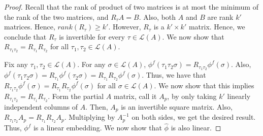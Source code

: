 \documentclass[10pt,letterpaper]{article}
\newcommand{\calL}{{\mathcal{L}}}
\newcommand{\rank}{{\calL(A)}}
\begin{document}
\begin{proof}
Recall that the rank of product of two matrices is at most the minimum of the rank of the two matrices, and $R_{\tau} A = B$. Also, both $A$ and $B$ are rank $k'$ matrices. Hence, $rank(R_{\tau}) \ge k'$. However, $R_{\tau}$ is a $k' \times k'$ matrix. Hence, we conclude that $R_{\tau}$ is invertible for every $\tau \in \rank$. We now show that $R_{\tau_1 \tau_2} = R_{\tau_1} R_{\tau_2}$ for all $\tau_1,\tau_2 \in \rank$. 

%

Fix any $\tau_1,\tau_2 \in \rank$. For any $\sigma \in \rank$, $\phi^f(\tau_1 \tau_2 \sigma) = R_{\tau_1 \tau_2} \phi^f(\sigma)$. Also, $\phi^f(\tau_1 \tau_2 \sigma) = R_{\tau_1} \phi^f(\tau_2 \sigma) = R_{\tau_1}R_{\tau_2} \phi^f(\sigma)$. Thus, we have that $R_{\tau_1 \tau_2} \phi^f(\sigma) = R_{\tau_1} R_{\tau_2} \phi^f(\sigma)$ for all $\sigma \in \rank$. We now show that this implies $R_{\tau_1 \tau_2} = R_{\tau_1} R_{\tau_2}$. Form the partial $A$ matrix, call it $A_p$, by only taking $k'$ linearly independent columns of $A$. Then, $A_p$ is an invertible square matrix. Also, $R_{\tau_1 \tau_2} A_p = R_{\tau_1} R_{\tau_2} A_p$. Multiplying by $A_p^{-1}$ on both sides, we get the desired result. Thus, $\phi^f$ is a linear embedding. We now show that $\hat{\phi}$ is also linear. 


\end{proof}
\end{document}
